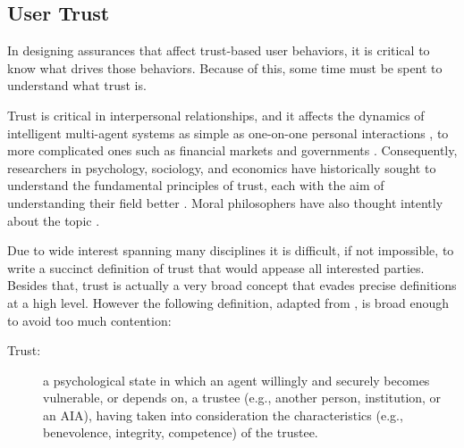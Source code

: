 \subsection{User Trust} \label{sec:trust}
    In designing assurances that affect trust-based user behaviors, it is critical to know what drives those behaviors. Because of this, some time must be spent to understand what trust is. 

    Trust is critical in interpersonal relationships, and it affects the dynamics of intelligent multi-agent systems as simple as one-on-one personal interactions  \cite{Lewicki2006-hj}, to more complicated ones such as financial markets and governments \cite{Fukuyama1995-un}. Consequently, researchers in psychology, sociology, and economics have historically sought to understand the fundamental principles of trust, each with the aim of understanding their field better \cite{Gambetta1988-pi}. Moral philosophers have also thought intently about the topic \cite{Baier1986-im}.

    Due to wide interest spanning many disciplines it is difficult, if not impossible, to write a succinct definition of trust that would appease all interested parties. Besides that, trust is actually a very broad concept that evades precise definitions at a high level. However the following definition, adapted from \cite{McKnight2004-vv}, is broad enough to avoid too much contention:

    \begin{description}
        \item [Trust:] a psychological state in which an agent willingly and securely becomes vulnerable, or depends on, a trustee (e.g., another person, institution, or an AIA), having taken into consideration the characteristics (e.g., benevolence, integrity, competence) of the trustee.
    \end{description}

